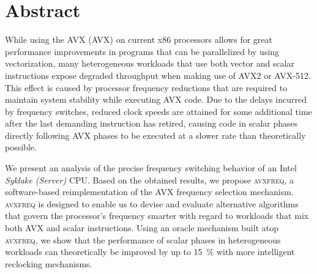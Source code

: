 \chapter{Abstract}
\label{sec:abstract}

While using the \acrlong{AVX} (\acrshort{AVX}) on current \gls{x86} processors allows for great performance improvements in programs that can be parallelized by using vectorization, many heterogeneous workloads that use both vector and scalar instructions expose degraded throughput when making use of \gls{AVX2} or \gls{AVX-512}. This effect is caused by processor frequency reductions that are required to maintain system stability while executing \acrshort{AVX} code. Due to the delays incurred by frequency switches, reduced clock speeds are attained for some additional time after the last demanding instruction has retired, causing code in scalar phases directly following  \acrshort{AVX} phases to be executed at a slower rate than theoretically possible.

We present an analysis of the precise frequency switching behavior of an Intel \textit{Syklake (Server)} \gls{CPU}. Based on the obtained results, we propose \textsc{avxfreq}, a software-based reimplementation of the \acrshort{AVX} frequency selection mechanism. \textsc{avxfreq} is designed to enable us to devise and evaluate alternative algorithms that govern the processor's frequency smarter with regard to workloads that mix both \acrshort{AVX} and scalar instructions. Using an oracle mechanism built atop \textsc{avxfreq}, we show that the performance of scalar phases in heterogeneous workloads can theoretically be improved by up to \SI{15}{\percent} with more intelligent reclocking mechanisms.
